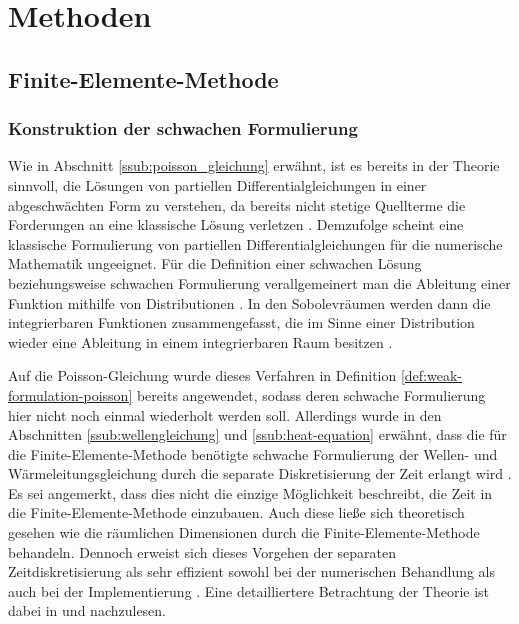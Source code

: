 \documentclass[crop=false]{standalone}
\begin{document}
  \section{Methoden} %
  \label{sec:methoden}
    \subsection{Finite-Elemente-Methode} %
    \label{sub:finite_elemente_methode}

      \subsubsection{Konstruktion der schwachen Formulierung}
        Wie in Abschnitt \ref{ssub:poisson_gleichung} erwähnt, ist es bereits in der Theorie sinnvoll, die Lösungen von partiellen Differentialgleichungen in einer abgeschwächten Form zu verstehen, da bereits nicht stetige Quellterme die Forderungen an eine klassische Lösung verletzen \cite[S.~46]{Schweizer2013}.
        Demzufolge scheint eine klassische Formulierung von partiellen Differentialgleichungen für die numerische Mathematik ungeeignet.
        Für die Definition einer schwachen Lösung beziehungsweise schwachen Formulierung verallgemeinert man die Ableitung einer Funktion mithilfe von Distributionen \cite[S.~46~ff]{Schweizer2013}.
        In den Sobolevräumen werden dann die integrierbaren Funktionen zusammengefasst, die im Sinne einer Distribution wieder eine Ableitung in einem integrierbaren Raum besitzen \cite[S.~54~ff]{Schweizer2013}.

        Auf die Poisson-Gleichung wurde dieses Verfahren in Definition \ref{def:weak-formulation-poisson} bereits angewendet, sodass deren schwache Formulierung hier nicht noch einmal wiederholt werden soll.
        Allerdings wurde in den Abschnitten \ref{ssub:wellengleichung} und \ref{ssub:heat-equation} erwähnt, dass die für die Finite-Elemente-Methode benötigte schwache Formulierung der Wellen- und Wärmeleitungsgleichung durch die separate Diskretisierung der Zeit erlangt wird \cite{Alberty1998,Logan2007}.
        Es sei angemerkt, dass dies nicht die einzige Möglichkeit beschreibt, die Zeit in die Finite-Elemente-Methode einzubauen.
        Auch diese ließe sich theoretisch gesehen wie die räumlichen Dimensionen durch die Finite-Elemente-Methode behandeln.
        Dennoch erweist sich dieses Vorgehen der separaten Zeitdiskretisierung als sehr effizient sowohl bei der numerischen Behandlung als auch bei der Implementierung \cite{Logan2007}.
        Eine detailliertere Betrachtung der Theorie ist dabei in \cite[S.~211~ff]{Schweizer2013} und \cite[S.~653~ff]{Logan2007} nachzulesen.
\end{document}
